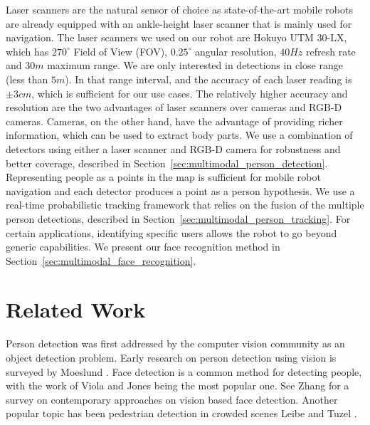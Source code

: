 \documentclass[12pt]{gatech-thesis}
\begin{document}
Laser scanners are the natural sensor of choice as state-of-the-art mobile robots are already equipped with an ankle-height laser scanner that is mainly used for navigation. The laser scanners we used on our robot are Hokuyo UTM 30-LX, which has $270^{\circ}$ Field of View (FOV), $0.25^{\circ}$ angular resolution, $40Hz$ refresh rate and $30m$ maximum range. We are only interested in detections in close range (less than $5m$). In that range interval, and the accuracy of each laser reading is $\pm 3cm$, which is sufficient for our use cases. The relatively higher accuracy and resolution are the two advantages of laser scanners over cameras and RGB-D cameras. Cameras, on the other hand, have the advantage of providing richer information, which can be used to extract body parts. We use a combination of detectors using either a laser scanner and RGB-D camera for robustness and better coverage, described in Section~\ref{sec:multimodal_person_detection}. Representing people as a points in the map is sufficient for mobile robot navigation and each detector produces a point as a person hypothesis. We use a real-time probabilistic tracking framework that relies on the fusion of the multiple person detections, described in Section~\ref{sec:multimodal_person_tracking}. For certain applications, identifying specific users allows the robot to go beyond generic capabilities. We present our face recognition method in Section~\ref{sec:multimodal_face_recognition}.

\section{Related Work}
\label{sec:multimodal_related_work}

Person detection was first addressed by the computer vision community as an object detection problem. Early research on person detection using vision is surveyed by Moeslund \cite{moeslund2001}. Face detection is a common method for detecting people, with the work of Viola and Jones \cite{viola2004robust} being the most popular one. See Zhang \cite{zhang2010survey} for a survey on contemporary approaches on vision based face detection. Another popular topic has been pedestrian detection in crowded scenes Leibe \cite{leibe2005pedestrian} and Tuzel \cite{tuzel2007human}.
\end{document}
